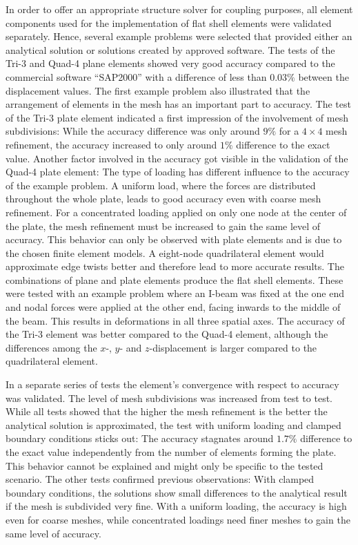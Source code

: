   In order to offer an appropriate structure solver for coupling purposes, all element components used for the implementation of flat shell elements were validated separately. Hence, several example problems were selected that provided either an analytical solution or solutions created by approved software. The tests of the Tri-3 and Quad-4 plane elements showed very good accuracy compared to the commercial software ``SAP2000'' with a difference of less than $0.03\%$ between the displacement values. The first example problem also illustrated that the arrangement of elements in the mesh has an important part to accuracy. The test of the Tri-3 plate element indicated a first impression of the involvement of mesh subdivisions: While the accuracy difference was only around $9\%$ for a $4\!\times\!4$ mesh refinement, the accuracy increased to only around $1\%$ difference to the exact value. Another factor involved in the accuracy got visible in the validation of the Quad-4 plate element: The type of loading has different influence to the accuracy of the example problem. A uniform load, where the forces are distributed throughout the whole plate, leads to good accuracy even with coarse mesh refinement. For a concentrated loading applied on only one node at the center of the plate, the mesh refinement must be increased to gain the same level of accuracy. This behavior can only be observed with plate elements and is due to the chosen finite element models. A eight-node quadrilateral element would approximate edge twists better and therefore lead to more accurate results. The combinations of plane and plate elements produce the flat shell elements. These were tested with an example problem where an I-beam was fixed at the one end and nodal forces were applied at the other end, facing inwards to the middle of the beam. This results in deformations in all three spatial axes. The accuracy of the Tri-3 element was better compared to the Quad-4 element, although the differences among the $x$-, $y$- and $z$-displacement is larger compared to the quadrilateral element.

  In a separate series of tests the element's convergence with respect to accuracy was validated. The level of mesh subdivisions was increased from test to test. While all tests showed that the higher the mesh refinement is the better the analytical solution is approximated, the test with uniform loading and clamped boundary conditions sticks out: The accuracy stagnates around $1.7\%$ difference to the exact value independently from the number of elements forming the plate. This behavior cannot be explained and might only be specific to the tested scenario. The other tests confirmed previous observations: With clamped boundary conditions, the solutions show small differences to the analytical result if the mesh is subdivided very fine. With a uniform loading, the accuracy is high even for coarse meshes, while concentrated loadings need finer meshes to gain the same level of accuracy. 
  
